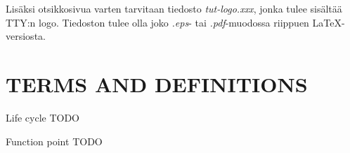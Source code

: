 Lisäksi otsikkosivua varten tarvitaan tiedosto \textit{tut-logo.xxx}, jonka
tulee sisältää TTY:n logo. Tiedoston tulee
olla joko \textit{.eps}- tai \textit{.pdf}-muodossa riippuen \LaTeX-versiosta.
 
\newpage
\tableofcontents
\newpage
\chapter*{TERMS AND DEFINITIONS}
 
\begin{termiluettelo}
 
\item [Life cycle] TODO
\item [Function point] TODO
 
\end{termiluettelo} 
 
 
\newpage
\renewcommand{\chaptermark}[1]{\markboth{\thechapter. \ #1}{}}
\renewcommand{\sectionmark}[1]{\markright{}{}}
\lhead{\fancyplain{}{\leftmark}}
 
